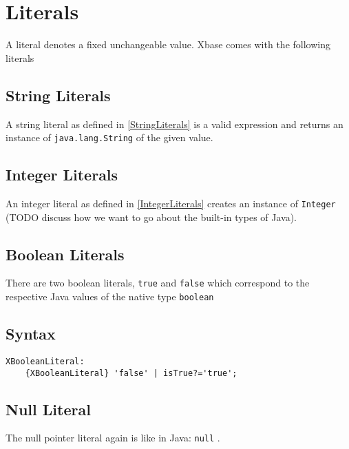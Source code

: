 \documentclass[a4paper,10pt]{scrreprt}
\begin{document}
\section{Literals}
\label{Literals}
A literal denotes a fixed unchangeable value. Xbase comes with the following literals

\subsection{String Literals}
\label{ExpressionsStringLiterals}
A string literal as defined in 
\autoref{StringLiterals} is a valid expression and returns an instance of \lstinline{java.lang.String}
 of the given value.




\subsection{Integer Literals}
\label{ExpressionsIntegerLiterals}
An integer literal as defined in 
\autoref{IntegerLiterals} creates an instance of \lstinline{Integer}
 (TODO discuss how we want to go about the built-in types of Java).




\subsection{Boolean Literals}
\label{BooleanLiteral}
There are two boolean literals, \lstinline{true}
 and \lstinline{false}
 which correspond to the respective Java values of the native type \lstinline{boolean}
 




\subsection{Syntax}

\begin{lstlisting}
XBooleanLiteral:
	{XBooleanLiteral} 'false' | isTrue?='true';

\end{lstlisting}





\subsection{Null Literal}
\label{NullLiteral}
The null pointer literal again is like in Java: \lstinline{null}
. 
\end{document}
